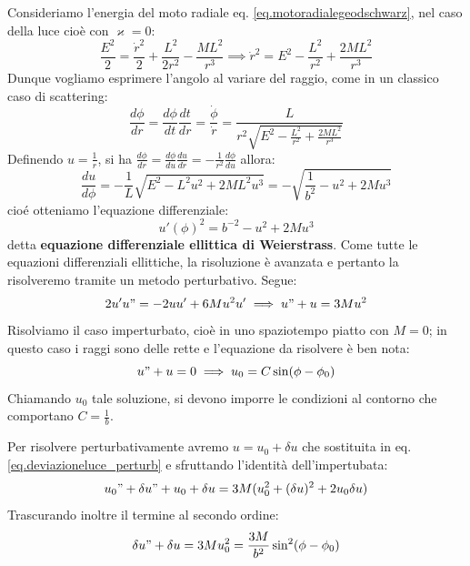 Consideriamo l'energia del moto radiale eq. \ref{eq.motoradialegeodschwarz}, nel caso della luce cioè con $\varkappa=0$:
\begin{equation*}
    \frac{E^2}{2}= \frac{\Dot{r}^2}{2} + \frac{L^2}{2r^2}-\frac{ML^2}{r^3} \implies \Dot{r}^2 = E^2 - \frac{L^2}{r^2} + \frac{2ML^2}{r^3}
\end{equation*}
Dunque vogliamo esprimere l'angolo al variare del raggio, come in un classico caso di scattering:
\begin{equation*}
    \frac{d\phi}{dr}= \frac{d\phi}{dt}\frac{dt}{dr} = \frac{\Dot{\phi}}{\Dot{r}} = \frac{L}{r^2\sqrt{ E^2 - \frac{L^2}{r^2} + \frac{2ML^2}{r^3} }}
\end{equation*}
Definendo $u=\frac{1}{r}$, si ha $\frac{d\phi}{dr}= \frac{d\phi}{du}\frac{du}{dr} = -\frac{1}{r^2}\frac{d\phi}{du}$ allora:
\begin{equation*}
    \frac{du}{d\phi} = - \frac{1}{L}\sqrt{  E^2 - L^2u^2 +2ML^2u^3    } =- \sqrt{ \frac{1}{b^2} - u^2 +2Mu^3}
\end{equation*}
cioé otteniamo l'equazione differenziale:
\begin{equation}
    u'(\phi)^2 = b^{-2} -u^2 +2Mu^3
    \label{eq.ellitticadeviazioneluce}
\end{equation}
detta \textbf{equazione differenziale ellittica  di Weierstrass}. Come tutte le equazioni differenziali ellittiche, la risoluzione è avanzata e pertanto la risolveremo tramite un metodo perturbativo. Segue:
\begin{equation}
    2u'u" = -2u u' +6Mu^2 u' \implies u" +u = 3Mu^2
    \label{eq.deviazioneluce_perturb}
\end{equation}
Risolviamo il caso imperturbato, cioè in uno spaziotempo piatto con $M=0$; in questo caso i raggi sono delle rette e l'equazione da risolvere è ben nota:
\begin{equation*}
    u" + u = 0 \implies u_0 = C\sin(\phi - \phi_0)
\end{equation*}
Chiamando $u_0$ tale soluzione, si devono imporre le condizioni al contorno che comportano $C=\frac{1}{b}$.

Per risolvere perturbativamente avremo $u= u_0 +\delta u$ che sostituita in eq. \ref{eq.deviazioneluce_perturb} e sfruttando l'identità dell'impertubata:
\begin{equation*}
    u_0"+ \delta u" + u_0 + \delta u = 3M(u_0^2 +(\delta u)^2 +2u_0\delta u)
\end{equation*}
Trascurando inoltre il termine al secondo ordine:
\begin{equation*}
    \delta u" +\delta u =3Mu_0^2 = \frac{3M}{b^2}\sin^2(\phi - \phi_0)
\end{equation*}

